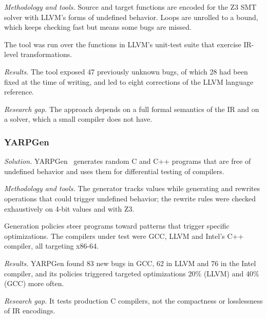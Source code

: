 \documentclass{ieeeaccess}
\begin{document}
\textit{Methodology and tools.} Source and target functions are encoded for the Z3 SMT solver with LLVM's forms of undefined behavior. Loops are unrolled to a bound, which keeps checking fast but means some bugs are missed.

The tool was run over the functions in LLVM's unit-test suite that exercise IR-level transformations.

\textit{Results.} The tool exposed 47 previously unknown bugs, of which 28 had been fixed at the time of writing, and led to eight corrections of the LLVM language reference.

\textit{Research gap.} The approach depends on a full formal semantics of the IR and on a solver, which a small compiler does not have.

\subsubsection{YARPGen}
\textit{Solution.} YARPGen~\cite{livinskii2020yarpgen} generates random C and C++ programs that are free of undefined behavior and uses them for differential testing of compilers.

\textit{Methodology and tools.} The generator tracks values while generating and rewrites operations that could trigger undefined behavior; the rewrite rules were checked exhaustively on 4-bit values and with Z3.

Generation policies steer programs toward patterns that trigger specific optimizations. The compilers under test were GCC, LLVM and Intel's C++ compiler, all targeting x86-64.

\textit{Results.} YARPGen found 83 new bugs in GCC, 62 in LLVM and 76 in the Intel compiler, and its policies triggered targeted optimizations 20\% (LLVM) and 40\% (GCC) more often.

\textit{Research gap.} It tests production C compilers, not the compactness or losslessness of IR encodings.
\end{document}
